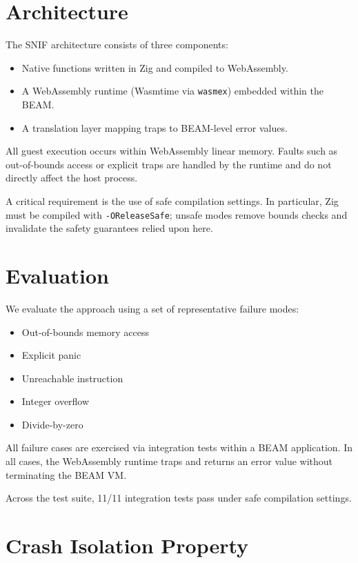 \documentclass{article}
\begin{document}
\section{Architecture}

The SNIF architecture consists of three components:

\begin{itemize}
  \item Native functions written in Zig and compiled to WebAssembly.
  \item A WebAssembly runtime (Wasmtime via \texttt{wasmex}) embedded within the BEAM.
  \item A translation layer mapping traps to BEAM-level error values.
\end{itemize}

All guest execution occurs within WebAssembly linear memory. Faults such as out-of-bounds access or explicit traps are handled by the runtime and do not directly affect the host process.

A critical requirement is the use of safe compilation settings. In particular, Zig must be compiled with \texttt{-OReleaseSafe}; unsafe modes remove bounds checks and invalidate the safety guarantees relied upon here.

\section{Evaluation}

We evaluate the approach using a set of representative failure modes:

\begin{itemize}
  \item Out-of-bounds memory access
  \item Explicit panic
  \item Unreachable instruction
  \item Integer overflow
  \item Divide-by-zero
\end{itemize}

All failure cases are exercised via integration tests within a BEAM application. In all cases, the WebAssembly runtime traps and returns an error value without terminating the BEAM VM.

Across the test suite, 11/11 integration tests pass under safe compilation settings.

\section{Crash Isolation Property}
\end{document}
